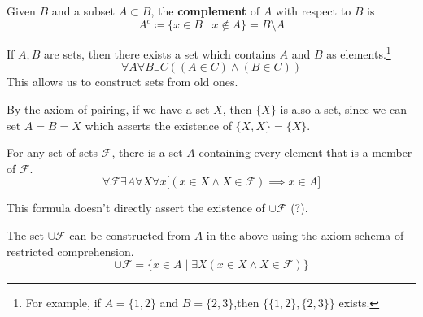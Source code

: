 \documentclass{article}
\begin{document}
    \begin{definition}
      Given $B$ and a subset $A \subset B$, the \textbf{complement} of $A$ with respect to $B$ is 
      \begin{equation}
        A^c \coloneqq \{ x \in B \mid x \not\in A \} = B \setminus A
      \end{equation}
    \end{definition}

    \begin{axiom}
      If $A, B$ are sets, then there exists a set which contains $A$ and $B$ as elements.\footnote{For example, if $A = \{1, 2\}$ and $B = \{2, 3\}$,then $\{\{1, 2\}, \{2, 3\}\}$ exists.}
      \begin{equation}
        \forall A \forall B \exists C((A \in C) \land (B \in C))
      \end{equation}
      This allows us to construct sets from old ones. 
    \end{axiom}

    \begin{theorem}
      By the axiom of pairing, if we have a set $X$, then $\{X\}$ is also a set, since we can set $A = B = X$ which asserts the existence of $\{X, X\} = \{X\}$. 
    \end{theorem}

    \begin{axiom}
      For any set of sets $\mathcal{F}$, there is a set $A$ containing every element that is a member of $\mathcal{F}$.
      \begin{equation}
        \forall \mathcal{F} \exists A \forall X \forall x \big[ (x \in X \land X \in \mathcal{F}) \implies x \in A \big]
      \end{equation}
    \end{axiom}

    This formula doesn't directly assert the existence of $\cup \mathcal{F}$ (?). 

    \begin{definition}[Union]
      The set $\cup \mathcal{F}$ can be constructed from $A$ in the above using the axiom schema of restricted comprehension. 
      \begin{equation}
        \cup \mathcal{F} = \{ x \in A \mid \exists X (x \in X \land X \in \mathcal{F} ) \}
      \end{equation}
    \end{definition}
\end{document}
